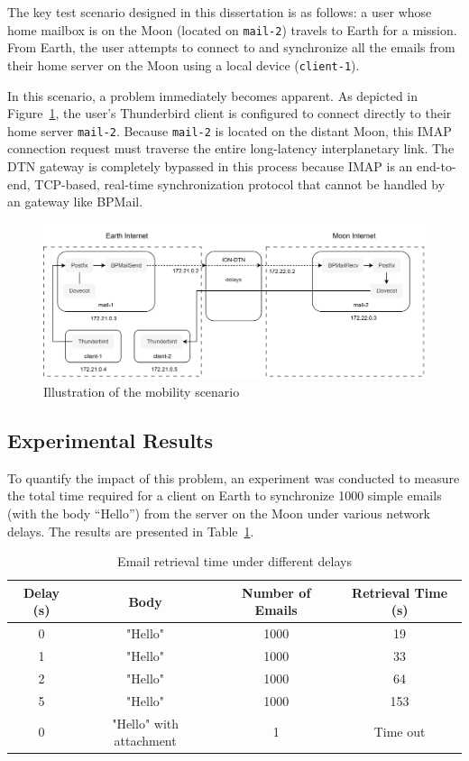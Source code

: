 The key test scenario designed in this dissertation is as follows: a user whose home mailbox is on the Moon (located on \texttt{mail-2}) travels to Earth for a mission.  
From Earth, the user attempts to connect to and synchronize all the emails from their home server on the Moon using a local device (\texttt{client-1}).

In this scenario, a problem immediately becomes apparent.  
As depicted in Figure~\ref{fig:mobility_scenario}, the user's Thunderbird client is configured to connect directly to their home server \texttt{mail-2}.
Because \texttt{mail-2} is located on the distant Moon, this IMAP connection request must traverse the entire long-latency interplanetary link.  
The DTN gateway is completely bypassed in this process because IMAP is an end-to-end, TCP-based, real-time synchronization protocol that cannot be handled by an gateway like BPMail.


\begin{figure}[ht]
      \centering
      \includegraphics[width=1.0\textwidth]{Results/mobility_scenario.png}
      \caption{Illustration of the mobility scenario}
      \label{fig:mobility_scenario}
\end{figure}

\subsection{Experimental Results}
To quantify the impact of this problem, an experiment was conducted to measure the total time required for a client on Earth to synchronize 1000 simple emails (with the body ``Hello'') from the server on the Moon under various network delays.  
The results are presented in Table~\ref{tab:email-retrieval-time}.

\begin{table}[ht]
\centering
\setlength{\tabcolsep}{10pt}
\caption{Email retrieval time under different delays}
\label{tab:email-retrieval-time}
\begin{tabular}{cccc}
\hline
\textbf{Delay (s)} & \textbf{Body} & \textbf{Number of Emails} & \textbf{Retrieval Time (s)} \\
\hline
0   & "Hello" & 1000 & 19  \\
1   & "Hello" & 1000 & 33  \\
2   & "Hello" & 1000 & 64  \\
5   & "Hello" & 1000 & 153 \\
0   & "Hello" with attachment & 1 & Time out \\
\hline
\end{tabular}
\end{table}

